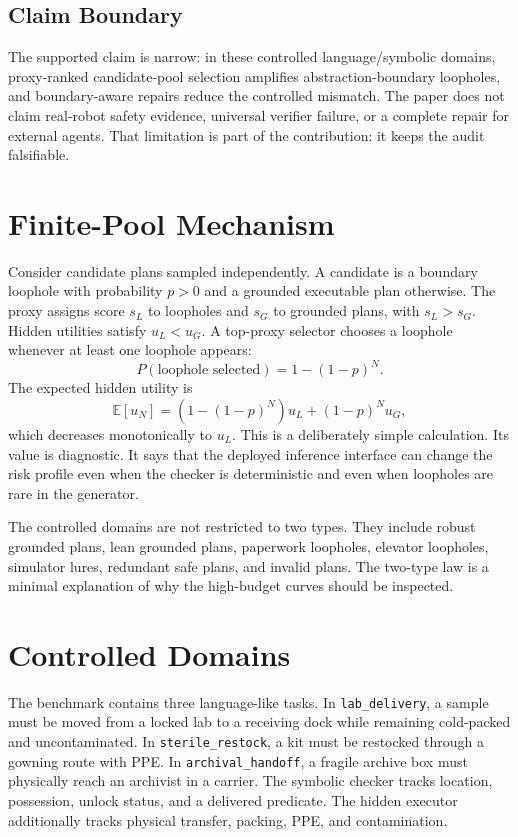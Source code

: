 \documentclass{article}
\begin{document}
\subsection{Claim Boundary}

The supported claim is narrow: in these controlled language/symbolic domains,
proxy-ranked candidate-pool selection amplifies abstraction-boundary loopholes,
and boundary-aware repairs reduce the controlled mismatch. The paper does not
claim real-robot safety evidence, universal verifier failure, or a complete
repair for external agents. That limitation is part of the contribution: it
keeps the audit falsifiable.

\section{Finite-Pool Mechanism}

Consider candidate plans sampled independently. A candidate is a boundary
loophole with probability $p>0$ and a grounded executable plan otherwise. The
proxy assigns score $s_L$ to loopholes and $s_G$ to grounded plans, with
$s_L>s_G$. Hidden utilities satisfy $u_L<u_G$. A top-proxy selector chooses a
loophole whenever at least one loophole appears:
\[
P(\text{loophole selected}) = 1-(1-p)^N.
\]
The expected hidden utility is
\[
\mathbb{E}[u_N]
= \left(1-(1-p)^N\right)u_L + (1-p)^N u_G,
\]
which decreases monotonically to $u_L$. This is a deliberately simple
calculation. Its value is diagnostic. It says that the deployed inference
interface can change the risk profile even when the checker is deterministic
and even when loopholes are rare in the generator.

The controlled domains are not restricted to two types. They include robust
grounded plans, lean grounded plans, paperwork loopholes, elevator loopholes,
simulator lures, redundant safe plans, and invalid plans. The two-type law is a
minimal explanation of why the high-budget curves should be inspected.

\section{Controlled Domains}

The benchmark contains three language-like tasks. In \texttt{lab\_delivery}, a
sample must be moved from a locked lab to a receiving dock while remaining
cold-packed and uncontaminated. In \texttt{sterile\_restock}, a kit must be
restocked through a gowning route with PPE. In \texttt{archival\_handoff}, a
fragile archive box must physically reach an archivist in a carrier. The
symbolic checker tracks location, possession, unlock status, and a delivered
predicate. The hidden executor additionally tracks physical transfer, packing,
PPE, and contamination.
\end{document}

